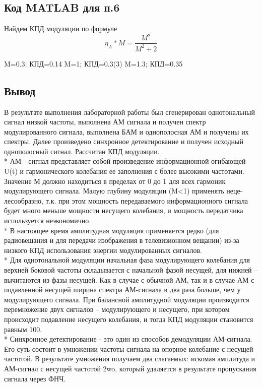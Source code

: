 \documentclass[10pt,a4paper]{article}
\begin{document}
\FloatBarrier
\subsection{Код MATLAB для п.6}
Найдем КПД модуляции по формуле
\begin{displaymath}
\eta_{A}*M=\frac{M^{2}}{M^{2}+2}
\end{displaymath}
\begin{center}
M=0.3; КПД=0.14\newline
M=1; КПД=0.3(3)\newline
M=1.3; КПД=0.35\newline
\end{center}
\subsection{Вывод}
В результате выполнения лабораторной работы был сгенерирован однотональный сигнал низкой частоты, выполнена АМ сигнала и получен спектр модулированного сигнала, выполнена БАМ и однополосная АМ и получены их спектры. Далее произведено синхронное детектирование и получен исходный однополосный сигнал. Рассчитан КПД модуляции.\\*
АМ - сигнал представляет собой произведение информационной огибающей U(t) и гармонического колебания ее заполнения с более высокими частотами. Значение М должно находиться в пределах от 0 до 1 для всех гармоник модулирующего сигнала. Малую глубину модуляции (M<1) применять неце-
лесообразно, т.к. при этом мощность передаваемого информационного сигнала будет много меньше мощности несущего колебания, и мощность
передатчика используется неэкономично.\\*
В настоящее время амплитудная модуляция применяется редко (для радиовещания и для передачи изображения в телевизионном вещании) из-за низкого КПД использования энергии модулированных сигналов.\\*
Для однотональной модуляции начальная фаза модулирующего колебания для верхней боковой частоты складывается с начальной фазой несущей, для нижней – вычитаются из фазы несущей. Как в случае с обычной АМ, так и в случае АМ с подавленной несущей ширина спектра АМ-сигнала  в два раза больше, чем у модулирующего сигнала. При балансной амплитудной модуляции производится перемножение двух сигналов – модулирующего и несущего, при котором происходит подавление несущего колебания, и тогда КПД модуляции становится равным 100.\\*
Синхронное детектирование - это один из способов демодуляции АМ-сигнала. Его суть состоит в умножении частоты сигнала на опорное колебание с несущей частотой. В результате умножения получаем два слагаемых: искомая амплитуда и АМ-сигнал с несущей частотой 2wo, который удаляется в результате пропускания сигнала через ФНЧ. 
\end{document}

